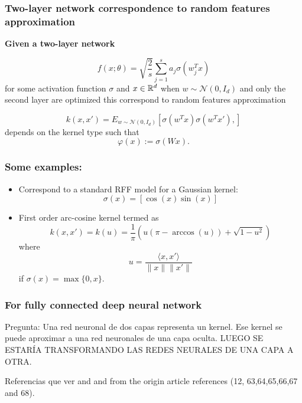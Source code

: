 \begin{frame}
  \frametitle{ Two-layer network correspondence to random features approximation}

  \textbf{Given a two-layer network}

  \begin{equation*}
    f(x;\theta)
    = 
    \sqrt{\frac{2}{s}}
    \sum_{j = 1}^s 
    a_j \sigma(w_j^T x)
  \end{equation*}
  for some activation function $\sigma$ and $x \in \mathbb{R}^d$
  when $w \sim \mathcal{N}(0, I_d)$ and only the second layer are optimized this correspond to random features approximation 

  \begin{equation}
    k(x, x')
    = 
    E_{w \sim \mathcal{N}(0, I_d)}
    \left[
    \sigma{( w^T x )}
    \sigma{( w^T x')}, 
  \right]
  \end{equation}
  depends on the
  kernel type such that 
  \begin{equation}
    \varphi(x) := \sigma(Wx). 
  \end{equation}
  
\end{frame}

\begin{frame}
  \frametitle{Some examples:}

  \begin{itemize}
    \item Correspond to a standard RFF model for a Gaussian kernel: 
    \begin{equation}
      \sigma(x) = \left[ \cos(x) \sin(x)\right]
    \end{equation}
    \item First order arc-cosine kernel 
    termed as 
    \begin{equation}
      k(x, x')
      = 
      k(u)
      = 
      \frac{1}{\pi}(u (\pi - \arccos(u))+ \sqrt{1 -u^2})
    \end{equation}
    where 
    \begin{equation}
      u = \frac{\langle x, x' \rangle}{\|x\|\|x'\|}
    \end{equation}
    if $\sigma(x) = \max\{0,x\}$. 
  \end{itemize}
\end{frame}

\begin{frame}
  \frametitle{For fully connected deep neural network}

  Pregunta: 
  Una red neuronal de dos capas representa un kernel. 
  Ese kernel se puede aproximar a una red neuronales de una capa oculta. 
  LUEGO SE ESTARÍA TRANSFORMANDO LAS REDES NEURALES DE UNA CAPA A OTRA.

  Referencias que ver \cite{daniely2017deeper} and \cite{lee2018deep} and from the origin article references (12, 63,64,65,66,67 and 68).
\end{frame}


